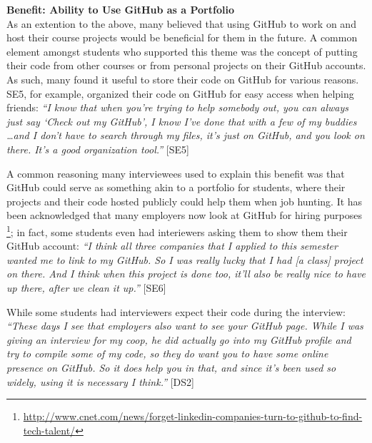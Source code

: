 
\textbf{Benefit: Ability to Use GitHub as a Portfolio} \\
As an extention to the above, many believed that using GitHub to work on and host their course projects would be beneficial for them in the future. A common element amongst students who supported this theme was the concept of putting their code from other courses or from personal projects on their GitHub accounts. As such, many found it useful to store their code on GitHub for various reasons. SE5, for example, organized their code on GitHub for easy access when helping friends: \textit{``I know that when you're trying to help somebody out, you can always just say `Check out my GitHub', I know I've done that with a few of my buddies \ldots and I don't have to search through my files, it's just on GitHub, and you look on there. It's a good organization tool.''} [SE5]

A common reasoning many interviewees used to explain this benefit was that GitHub could serve as something akin to a portfolio for students, where their projects and their code hosted publicly could help them when job hunting. It has been acknowledged that many employers now look at GitHub for hiring purposes \footnote{\url{http://www.cnet.com/news/forget-linkedin-companies-turn-to-github-to-find-tech-talent/}}; in fact, some students even had interiewers asking them to show them their GitHub account: \textit{``I think all three companies that I applied to this semester wanted me to link to my GitHub. So I was really lucky that I had [a class] project on there. And I think when this project is done too, it'll also be really nice to have up there, after we clean it up.''} [SE6]

While some students had interviewers expect their code during the interview: \textit{``These days I see that employers also want to see your GitHub page. While I was giving an interview for my coop, he did actually go into my GitHub profile and try to compile some of my code, so they do want you to have some online presence on GitHub. So it does help you in that, and since it's been used so widely, using it is necessary I think.''} [DS2]

